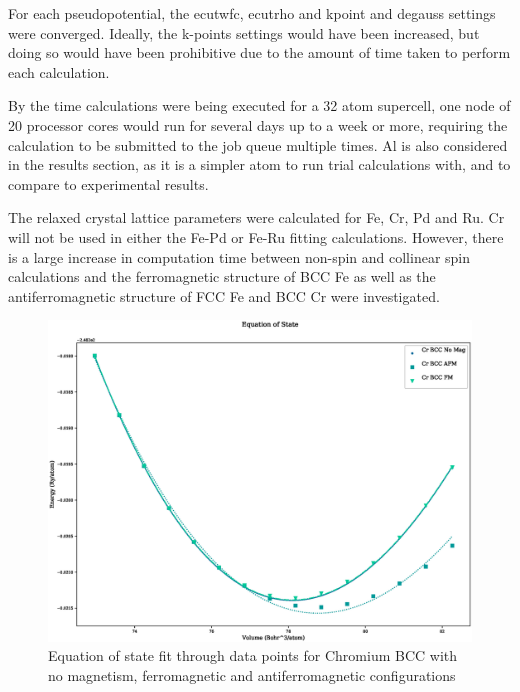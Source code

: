 For each pseudopotential, the ecutwfc, ecutrho and kpoint and degauss settings were converged.  Ideally, the k-points settings would have been increased, but doing so would have been prohibitive due to the amount of time taken to perform each calculation.

By the time calculations were being executed for a 32 atom supercell, one node of 20 processor cores would run for several days up to a week or more, requiring the calculation to be submitted to the job queue multiple times.  \Gls{Al} is also considered in the results section, as it is a simpler atom to run trial calculations with, and to compare to experimental results.

The relaxed crystal lattice parameters were calculated for \Gls{Fe}, \Gls{Cr}, \Gls{Pd} and \Gls{Ru}.  Cr will not be used in either the Fe-Pd or Fe-Ru fitting calculations.  However, there is a large increase in computation time between non-spin and collinear spin calculations and the ferromagnetic structure of BCC Fe as well as the antiferromagnetic structure of FCC Fe and BCC Cr were investigated. 

\FloatBarrier
\begin{figure}[h]
\begin{center}
\includegraphics[scale=0.45]{chapters/potentials_fe_pd_ru/qeeos_plots/cr-mag/eos.eps}
\caption{Equation of state fit through data points for Chromium BCC with no magnetism, ferromagnetic and antiferromagnetic configurations}
\label{fig:chromiumeos}
\end{center}
\end{figure}


